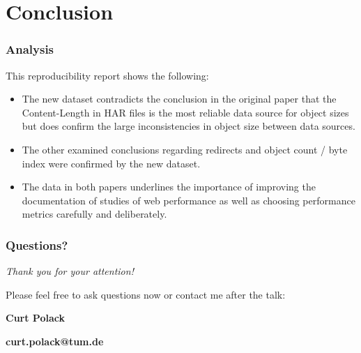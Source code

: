 \section{Conclusion}

\begin{frame}
    \frametitle{Analysis}
	This reproducibility report shows the following: 
	\begin{itemize}
        \item The new dataset contradicts the conclusion in the original paper that the Content-Length in HAR files is the most reliable data source for object sizes but does confirm the large inconsistencies in object size between data sources.
        \item The other examined conclusions regarding redirects and object count / byte index were confirmed by the new dataset.
        \item The data in both papers underlines the importance of improving the documentation of studies of web performance as well as choosing performance metrics carefully and deliberately. 
   	 \end{itemize}
\end{frame}

\begin{frame}
    \frametitle{Questions?}
      \centering \Large
  	\emph{Thank you for your attention!}
  	
  	Please feel free to ask questions now or contact me after the talk:
    
    \textbf{Curt Polack}
    
    \textbf{curt.polack@tum.de}
    
    
\end{frame}
